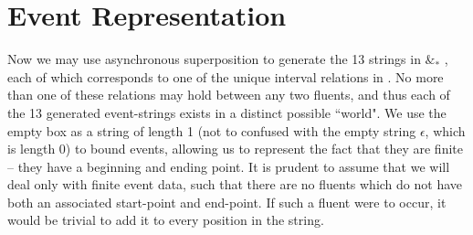\documentclass[a4paper,11pt]{article}
\newcommand{\vph}[1]{\vphantom{#1}}
\newcommand{\eboxl}[1]{\fbox{$\vph{'}#1$}}
\begin{document}
\section{Event Representation}\label{event rep}
Now we may use asynchronous superposition to generate the 13 strings in 
\eboxl{}\eboxl{e}\eboxl{} 
$\&_*$ 
\eboxl{}\eboxl{e'}\eboxl{}, each of which corresponds to one 
of the unique interval relations in \cite{allen1983maintaining}. No more than 
one of these relations may hold between any two fluents, and thus each of the 
13 generated event-strings exists in a distinct possible ``world".
We use the empty box \eboxl{} as a string of length 1 (not to confused 
with the empty string $\epsilon$, which is length 0) to bound events, allowing 
us to represent the fact that they are finite -- they have a beginning and 
ending point. It is prudent to assume that we will deal only with finite event 
data, such that there are no fluents which do not have both an associated 
start-point and end-point. If such a fluent were to occur, it would be trivial 
to add it to every position in the string. 
\end{document}
